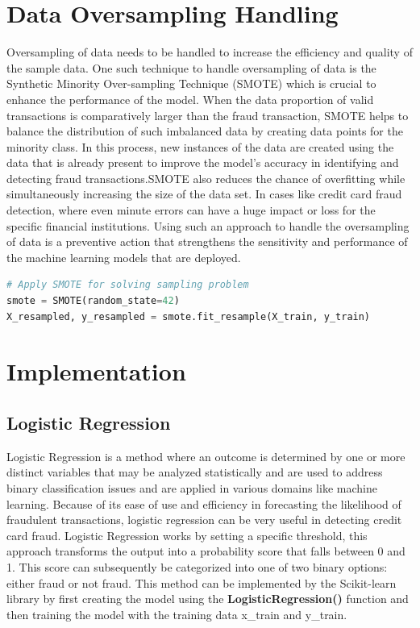  \section{Data Oversampling Handling}
Oversampling of data needs to be handled to increase the efficiency and quality of the sample data. One such technique to handle oversampling of data is the Synthetic Minority Over-sampling Technique (SMOTE) which is crucial to enhance the performance of the model. When the data proportion of valid transactions is comparatively larger than the fraud transaction, SMOTE helps to balance the distribution of such imbalanced data by creating data points for the minority class. In this process, new instances of the data are created using the data that is already present to improve the model’s accuracy in identifying and detecting fraud transactions.SMOTE also reduces the chance of overfitting while simultaneously increasing the size of the data set. In cases like credit card fraud detection, where even minute errors can have a huge impact or loss for the specific financial institutions. Using such an approach to handle the oversampling of data is a preventive action that strengthens the sensitivity and performance of the machine learning models that are deployed.

\begin{lstlisting}[language=Python, caption={Handle Oversampling of Data}, label=list:python_code_ex]
# Apply SMOTE for solving sampling problem
smote = SMOTE(random_state=42)
X_resampled, y_resampled = smote.fit_resample(X_train, y_train)
\end{lstlisting}

 
 



\section{Implementation}
\subsection{Logistic Regression}
 Logistic Regression is a method where an outcome is determined by one or more distinct variables that may be analyzed statistically and are used to address binary classification issues and are applied in various domains like machine learning. Because of its ease of use and efficiency in forecasting the likelihood of fraudulent transactions, logistic regression can be very useful in detecting credit card fraud. Logistic Regression works by setting a specific threshold, this approach transforms the output into a probability score that falls between 0 and 1. This score can subsequently be categorized into one of two binary options: either fraud or not fraud. This method can be implemented by the Scikit-learn library by first creating the model using the \textbf{LogisticRegression()} function and then training the model with the training data x\_train and y\_train.


